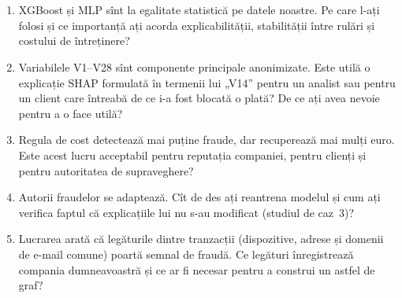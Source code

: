 \section{}
\begin{enumerate}
\item {}%
{XGBoost și MLP sînt la egalitate statistică pe datele noastre. Pe care l-ați folosi și ce importanță ați acorda explicabilității, stabilității între rulări și costului de întreținere?}
\item {}%
{Variabilele V1--V28 sînt componente principale anonimizate. Este utilă o explicație SHAP formulată în termenii lui „V14” pentru un analist sau pentru un client care întreabă de ce i-a fost blocată o plată? De ce ați avea nevoie pentru a o face utilă?}
\item {}%
{Regula de cost detectează mai puține fraude, dar recuperează mai mulți euro. Este acest lucru acceptabil pentru reputația companiei, pentru clienți și pentru autoritatea de supraveghere?}
\item {}%
{Autorii fraudelor se adaptează. Cît de des ați reantrena modelul și cum ați verifica faptul că explicațiile lui nu s-au modificat (studiul de caz~3)?}
\item {}%
{Lucrarea arată că legăturile dintre tranzacții (dispozitive, adrese și domenii de e-mail comune) poartă semnal de fraudă. Ce legături înregistrează compania dumneavoastră și ce ar fi necesar pentru a construi un astfel de graf?}
\end{enumerate}

